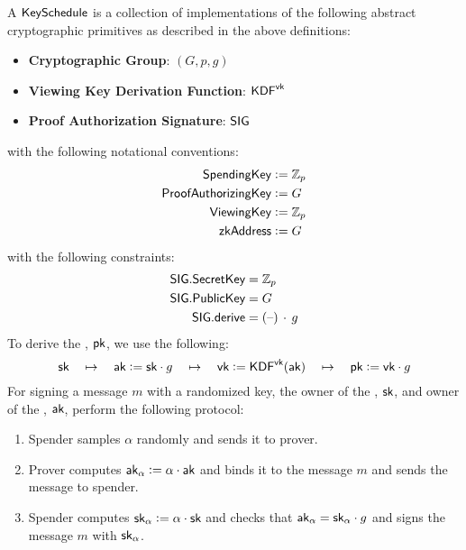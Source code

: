 \begin{definition}
    A ${\textsf{KeySchedule}}$ is a collection of implementations of the following abstract cryptographic primitives as described in the above definitions:
    \begin{itemize}
        \item \textbf{Cryptographic Group}: $(G, p, g)$
        \item \textbf{Viewing Key Derivation Function}: ${\textsf{KDF}}^{\textsf{vk}}$
        \item \textbf{Proof Authorization Signature}: ${\textsf{SIG}}$
    \end{itemize}
    with the following notational conventions:
    \begin{align*}
        {\textsf{SpendingKey}}         &:= \mathbb{Z}_p \\
        {\textsf{ProofAuthorizingKey}} &:= G \\
        {\textsf{ViewingKey}}          &:= \mathbb{Z}_p \\
        {\textsf{zkAddress}}           &:= G
    \end{align*}
    with the following constraints:
    \begin{align*}
        {\textsf{SIG}}.{\textsf{SecretKey}} &= \mathbb{Z}_p \\
        {\textsf{SIG}}.{\textsf{PublicKey}} &= G \\
        {\textsf{SIG}}.{\textsf{derive}}    &= ({\textrm{--}})\,\cdot\,g
    \end{align*}
    To derive the \zkAddress{}, ${\textsf{pk}}$, we use the following:
    \[{\textsf{sk}} \quad\mapsto\quad {\textsf{ak}} := {\textsf{sk}} \cdot g \quad\mapsto\quad {\textsf{vk}} := {\textsf{KDF}}^{\textsf{vk}}({\textsf{ak}}) \quad\mapsto\quad {\textsf{pk}} := {\textsf{vk}} \cdot g\]
    For signing a message $m$ with a randomized key, the owner of the \SpendingKey{}, ${\textsf{sk}}$, and owner of the \ProofAuthorizingKey{}, ${\textsf{ak}}$, perform the following protocol:
    \begin{enumerate}
        \item Spender samples $\alpha$ randomly and sends it to prover.
        \item Prover computes ${\textsf{ak}}_\alpha := \alpha \cdot {\textsf{ak}}$ and binds it to the message $m$ and sends the message to spender.
        \item Spender computes ${\textsf{sk}}_\alpha := \alpha \cdot {\textsf{sk}}$ and checks that ${\textsf{ak}}_\alpha = {\textsf{sk}}_\alpha \cdot g$ and signs the message $m$ with ${\textsf{sk}}_\alpha$.
    \end{enumerate}
\end{definition}


